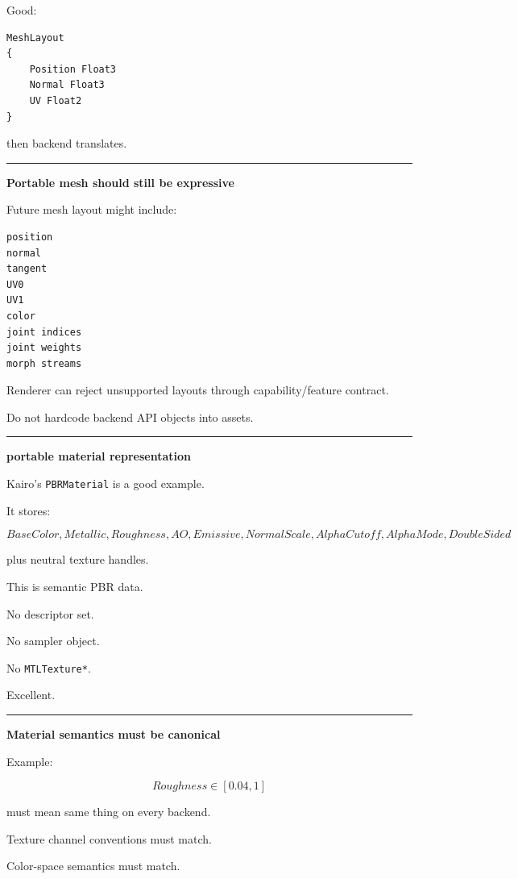 Good:

\begin{verbatim}
MeshLayout
{
    Position Float3
    Normal Float3
    UV Float2
}
\end{verbatim}

then backend translates.

\begin{center}\rule{0.5\linewidth}{0.5pt}\end{center}

\textbf{Portable mesh should still be expressive}

Future mesh layout might include:

\begin{verbatim}
position
normal
tangent
UV0
UV1
color
joint indices
joint weights
morph streams
\end{verbatim}

Renderer can reject unsupported layouts through capability/feature contract.

Do not hardcode backend API objects into assets.

\begin{center}\rule{0.5\linewidth}{0.5pt}\end{center}

\textbf{portable material representation}

Kairo's \texttt{PBRMaterial} is a good example.

It stores:

\[
BaseColor,
Metallic,
Roughness,
AO,
Emissive,
NormalScale,
AlphaCutoff,
AlphaMode,
DoubleSided
\]

plus neutral texture handles.

This is semantic PBR data.

No descriptor set.

No sampler object.

No \texttt{MTLTexture*}.

Excellent.

\begin{center}\rule{0.5\linewidth}{0.5pt}\end{center}

\textbf{Material semantics must be canonical}

Example:

\[
Roughness\in[0.04,1]
\]

must mean same thing on every backend.

Texture channel conventions must match.

Color-space semantics must match.

